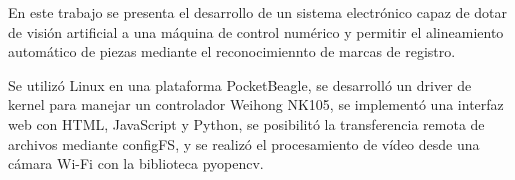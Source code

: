 En este trabajo se presenta el desarrollo de un sistema electrónico capaz de dotar de visión artificial a una máquina de control numérico y permitir el alineamiento automático de piezas mediante el reconocimiennto de marcas de registro.\par
Se utilizó Linux en una plataforma PocketBeagle, se desarrolló un driver de kernel para manejar un controlador Weihong NK105, se implementó una interfaz web con HTML, JavaScript y Python, se posibilitó la transferencia remota de archivos mediante configFS, y se realizó el procesamiento de vídeo desde una cámara Wi-Fi con la biblioteca pyopencv.

